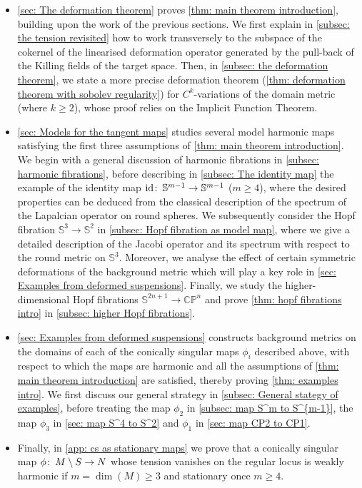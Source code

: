 \documentclass{article}
\numberwithin{equation}{section}        %
\theoremstyle{bfnote}
\theoremstyle{definition}
\theoremstyle{bfremark}
\newcommand{\col}{\colon \thinspace}        %
\newcommand{\Sp}{\mathbb{S}}                %
\DeclareMathOperator{\id}{id}                   %
\begin{document}
\begin{itemize}
    \item \cref{sec: The deformation theorem} proves \cref{thm: main theorem introduction}, building upon the work of the previous sections. We first explain in \cref{subsec: the tension revisited} how to work transversely to the subspace of the cokernel of the linearised deformation operator generated by the pull-back of the Killing fields of the target space. Then, in \cref{subsec: the deformation theorem}, we state a more precise deformation theorem (\cref{thm: deformation theorem with sobolev regularity}) for $C^k$-variations of the domain metric (where $k \geq 2$), whose proof relies on the Implicit Function Theorem. 
    
    \item \cref{sec: Models for the tangent maps} studies several model harmonic maps satisfying the first three assumptions of \cref{thm: main theorem introduction}. We begin with a general discussion of harmonic fibrations in \cref{subsec: harmonic fibrations}, before describing in \cref{subsec: The identity map} the example of the identity map $\id \col \Sp^{m-1} \to \Sp^{m-1}$ ($m \geq 4$), where the desired properties can be deduced from the classical description of the spectrum of the Lapalcian operator on round spheres. We subsequently consider the Hopf fibration $\Sp^3 \to \Sp^2$ in \cref{subsec: Hopf fibration as model map}, where we give a detailed description of the Jacobi operator and its spectrum with respect to the round metric on $\Sp^3$. Moreover, we analyse the effect of certain symmetric deformations of the background metric which will play a key role in \cref{sec: Examples from deformed suspensions}. Finally, we study the higher-dimensional Hopf fibrations $\Sp^{2n+1} \to \mathbb{CP}^n$ and prove \cref{thm: hopf fibrations intro} in \cref{subsec: higher Hopf fibrations}.
    
    \item \cref{sec: Examples from deformed suspensions} constructs background metrics on the domains of each of the conically singular maps $\phi_i$ described above, with respect to which the maps are harmonic and all the assumptions of \cref{thm: main theorem introduction} are satisfied, thereby proving \cref{thm: examples intro}. We first discuss our general strategy in \cref{subsec: General stategy of examples}, before treating the map $\phi_2$ in \cref{subsec: map S^m to S^{m-1}}, the map $\phi_3$ in \cref{sec: map S^4 to S^2} and $\phi_1$ in \cref{sec: map CP2 to CP1}.
    
    \item Finally, in \cref{app: cs as stationary maps} we prove that a conically singular map $\phi \col M \setminus S \to N$ whose tension vanishes on the regular locus is weakly harmonic if  $m = \dim(M) \geq 3$ and stationary once $m \geq 4$.
\end{itemize}
\end{document}
